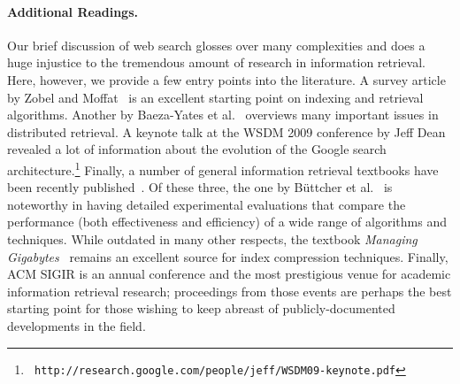 \paragraph{Additional Readings.} 
Our brief discussion of web search glosses over many complexities and
does a huge injustice to the tremendous amount of research in
information retrieval.  Here, however, we provide a few entry points
into the literature.  A survey article by Zobel and
Moffat~\cite{Zobel_Moffat_2006} is an excellent starting point on
indexing and retrieval algorithms.  Another by Baeza-Yates et
al.~\cite{Baeza-Yates_etal_2007} overviews many important issues in
distributed retrieval.  A keynote talk at the WSDM 2009 conference by
Jeff Dean revealed a lot of information about the evolution of the
Google search architecture.\footnote{\texttt{
  http://research.google.com/people/jeff/WSDM09-keynote.pdf}} Finally,
a number of general information retrieval textbooks have been recently
published~\cite{Manning_etal_2008,Croft_etal_2009,Buttcher_etal_2010}.
Of these three, the one by B\"uttcher et al.~\cite{Buttcher_etal_2010}
is noteworthy in having detailed experimental evaluations that compare
the performance (both effectiveness and efficiency) of a wide range of
algorithms and techniques.  While outdated in many other respects, the
textbook \emph{Managing Gigabytes}~\cite{Witten_etal_1999} remains an
excellent source for index compression techniques.  Finally, ACM SIGIR
is an annual conference and the most prestigious venue for academic
information retrieval research; proceedings from those events are
perhaps the best starting point for those wishing to keep abreast of
publicly-documented developments in the field.
